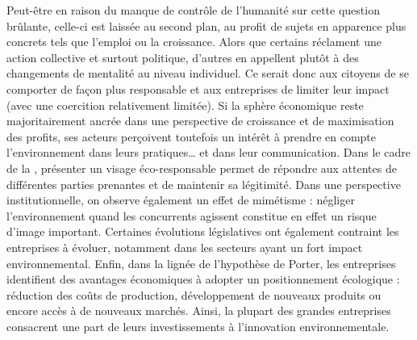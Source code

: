 Peut-être en raison du manque de contrôle de l'humanité sur cette question brûlante, celle-ci est laissée au second plan, au profit de sujets en apparence plus concrets tels que l’emploi ou la croissance. Alors que certains réclament une action collective et surtout politique, d’autres en appellent plutôt à des changements de mentalité au niveau individuel. Ce serait donc aux citoyens de se comporter de façon plus responsable et aux entreprises de limiter leur impact (avec une coercition relativement limitée). Si la sphère économique reste majoritairement ancrée dans une perspective de croissance et de maximisation des profits, ses acteurs perçoivent toutefois un intérêt à prendre en compte l’environnement dans leurs pratiques… et dans leur communication. Dans le cadre de la \rse, présenter un visage éco-responsable permet de répondre aux attentes de différentes parties prenantes et de maintenir sa légitimité. Dans une perspective institutionnelle, on observe également un effet de mimétisme : négliger l’environnement quand les concurrents agissent constitue en effet un risque d’image important. Certaines évolutions législatives ont également contraint les entreprises à évoluer, notamment dans les secteurs ayant un fort impact environnemental. Enfin, dans la lignée de l’hypothèse de Porter, les entreprises identifient des avantages économiques à adopter un positionnement écologique : réduction des coûts de production, développement de nouveaux produits ou encore accès à de nouveaux marchés. Ainsi, la plupart des grandes entreprises consacrent une part de leurs investissements à l’innovation environnementale. \\

